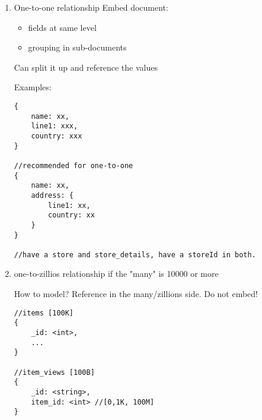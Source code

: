 \documentclass[11pt]{article}
\begin{document}
\begin{enumerate}
Example: embed in the main side - results in duplication, indexing is done on the array
\begin{verbatim}
//carts:
{
    _id: <objectId>,
    date: <date>,
    items: [
        {qty: xx,
         item: { //copy of item from item collection
             _id: <int>,
             title: <string>
             ...
         }
        }
        ]

}


//items
{
    _id: <int>,
    title: <string>
    ...
}
\end{verbatim}

Example: Using references
\begin{verbatim}
//items [100K]
{
    _id: <int>,
    title: <string>,
    sold_at [1,1000]: <string>

}

//stores [1000]
{
    _id: <objectId>,
    storeId: <string> //reference point
    ...
}
\end{verbatim}

Example: Reference in the secondary side. Need a second query to get more information
\begin{verbatim}
//items
{
    _id: <int>,
    ...
}

//stores
{
    ...,
    items_sold[1,10K,100K]: <int> //references _id above
}

\end{verbatim}

\item One-to-one relationship
\label{sec:orgd804167}
Embed document:
\begin{itemize}
\item fields at same level
\item grouping in sub-documents
\end{itemize}

Can split it up and reference the values

Examples:
\begin{verbatim}
{
    name: xx,
    line1: xxx,
    country: xxx
}

//recommended for one-to-one
{
    name: xx,
    address: {
        line1: xx,
        country: xx
    }
}

//have a store and store_details, have a storeId in both.
\end{verbatim}

\item one-to-zillios relationship
\label{sec:orgbedc85d}
if the "many" is 10000 or more

How to model? Reference in the many/zillions side. Do not embed!
\begin{verbatim}
//items [100K]
{
    _id: <int>,
    ...
}

//item_views [100B]
{
    _id: <string>,
    item_id: <int> //[0,1K, 100M]
}

\end{verbatim}
\end{enumerate}
\end{document}
